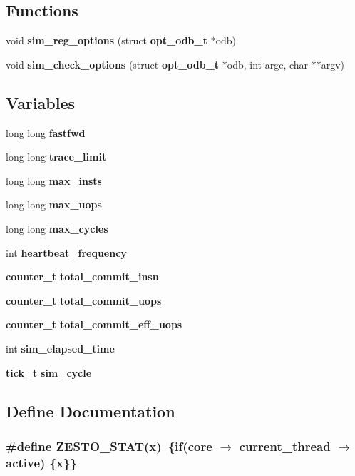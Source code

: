 \subsection*{Functions}
\begin{CompactItemize}
\item 
void {\bf sim\_\-reg\_\-options} (struct {\bf opt\_\-odb\_\-t} $\ast$odb)
\item 
void {\bf sim\_\-check\_\-options} (struct {\bf opt\_\-odb\_\-t} $\ast$odb, int argc, char $\ast$$\ast$argv)
\end{CompactItemize}
\subsection*{Variables}
\begin{CompactItemize}
\item 
long long {\bf fastfwd}
\item 
long long {\bf trace\_\-limit}
\item 
long long {\bf max\_\-insts}
\item 
long long {\bf max\_\-uops}
\item 
long long {\bf max\_\-cycles}
\item 
int {\bf heartbeat\_\-frequency}
\item 
{\bf counter\_\-t} {\bf total\_\-commit\_\-insn}
\item 
{\bf counter\_\-t} {\bf total\_\-commit\_\-uops}
\item 
{\bf counter\_\-t} {\bf total\_\-commit\_\-eff\_\-uops}
\item 
int {\bf sim\_\-elapsed\_\-time}
\item 
{\bf tick\_\-t} {\bf sim\_\-cycle}
\end{CompactItemize}


\subsection{Define Documentation}
\subsubsection[{ZESTO\_\-STAT}]{\setlength{\rightskip}{0pt plus 5cm}\#define ZESTO\_\-STAT(x)~\{if(core $\rightarrow$ current\_\-thread $\rightarrow$ active) \{x\}\}}\label{zesto-opts_8h_225a9a02a0c5a33775f2743a37dfd8d8}





